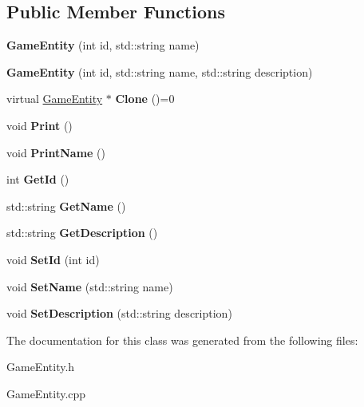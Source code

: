 \subsection*{Public Member Functions}
\begin{DoxyCompactItemize}
\item 
\hypertarget{class_game_entity_ac534073fe3e7b25d95029c8af622a88e}{}{\bfseries Game\+Entity} (int id, std\+::string name)\label{class_game_entity_ac534073fe3e7b25d95029c8af622a88e}

\item 
\hypertarget{class_game_entity_a941b5c3c653f7526545bd81816e9531a}{}{\bfseries Game\+Entity} (int id, std\+::string name, std\+::string description)\label{class_game_entity_a941b5c3c653f7526545bd81816e9531a}

\item 
\hypertarget{class_game_entity_a0effae7533a6e242c71a5ccd2bb5a030}{}virtual \hyperlink{class_game_entity}{Game\+Entity} $\ast$ {\bfseries Clone} ()=0\label{class_game_entity_a0effae7533a6e242c71a5ccd2bb5a030}

\item 
\hypertarget{class_game_entity_ac909a518389ee9bc92562b4166340766}{}void {\bfseries Print} ()\label{class_game_entity_ac909a518389ee9bc92562b4166340766}

\item 
\hypertarget{class_game_entity_aab71ff714f47988b091fc40f2c30195a}{}void {\bfseries Print\+Name} ()\label{class_game_entity_aab71ff714f47988b091fc40f2c30195a}

\item 
\hypertarget{class_game_entity_ad20b660a4f851e9636fdfd15f0d44df0}{}int {\bfseries Get\+Id} ()\label{class_game_entity_ad20b660a4f851e9636fdfd15f0d44df0}

\item 
\hypertarget{class_game_entity_ae45ee64de484dec1b16aea85171d9856}{}std\+::string {\bfseries Get\+Name} ()\label{class_game_entity_ae45ee64de484dec1b16aea85171d9856}

\item 
\hypertarget{class_game_entity_ac8da446a6c6990585b6581fe8537b7bf}{}std\+::string {\bfseries Get\+Description} ()\label{class_game_entity_ac8da446a6c6990585b6581fe8537b7bf}

\item 
\hypertarget{class_game_entity_a5846ca63544cea04c672d51361e82537}{}void {\bfseries Set\+Id} (int id)\label{class_game_entity_a5846ca63544cea04c672d51361e82537}

\item 
\hypertarget{class_game_entity_aa48a3a64bc80d6e199301b9d5bac4409}{}void {\bfseries Set\+Name} (std\+::string name)\label{class_game_entity_aa48a3a64bc80d6e199301b9d5bac4409}

\item 
\hypertarget{class_game_entity_a163f5785614921a65aab161491d8c47c}{}void {\bfseries Set\+Description} (std\+::string description)\label{class_game_entity_a163f5785614921a65aab161491d8c47c}

\end{DoxyCompactItemize}


The documentation for this class was generated from the following files\+:\begin{DoxyCompactItemize}
\item 
Game\+Entity.\+h\item 
Game\+Entity.\+cpp\end{DoxyCompactItemize}
